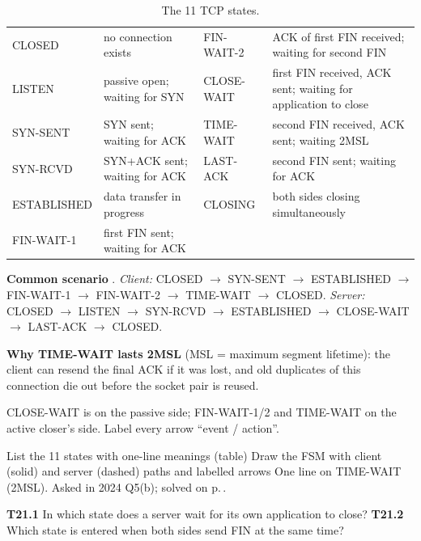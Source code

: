 \begin{table}[!htbp]\centering\footnotesize\zebra
\begin{tabularx}{\linewidth}{L{22mm}YL{20mm}Y}\toprule
{} &  &  & \\\midrule
CLOSED & no connection exists & FIN-WAIT-2 & ACK of first FIN received; waiting for second FIN\\
LISTEN & passive open; waiting for SYN & CLOSE-WAIT & first FIN received, ACK sent; waiting for application to close\\
SYN-SENT & SYN sent; waiting for ACK & TIME-WAIT & second FIN received, ACK sent; waiting 2MSL\\
SYN-RCVD & SYN+ACK sent; waiting for ACK & LAST-ACK & second FIN sent; waiting for ACK\\
ESTABLISHED & data transfer in progress & CLOSING & both sides closing simultaneously\\
FIN-WAIT-1 & first FIN sent; waiting for ACK &  & \\\bottomrule
\end{tabularx}
\caption{The 11 TCP states. }
\end{table}

\textbf{Common scenario} . \emph{Client:} CLOSED $\to$ SYN-SENT $\to$ ESTABLISHED $\to$ FIN-WAIT-1 $\to$ FIN-WAIT-2 $\to$ TIME-WAIT $\to$ CLOSED. \emph{Server:} CLOSED $\to$ LISTEN $\to$ SYN-RCVD $\to$ ESTABLISHED $\to$ CLOSE-WAIT $\to$ LAST-ACK $\to$ CLOSED.

\textbf{Why TIME-WAIT lasts 2MSL} (MSL = maximum segment lifetime): the client can resend the final ACK if it was lost, and old duplicates of this connection die out before the socket pair is reused.

\begin{warningbox}
CLOSE-WAIT is on the passive side; FIN-WAIT-1/2 and TIME-WAIT on the active closer's side. Label every arrow ``event / action''.
\end{warningbox}

\begin{answerplan}
 List the 11 states with one-line meanings (table) \quad {} Draw the FSM with client (solid) and server (dashed) paths and labelled arrows \quad
{} One line on TIME-WAIT (2MSL). Asked in 2024 Q5(b); solved on p.\,\pageref{q:MS2024-5b}.
\par{} \textbf{T21.1} In which state does a server wait for its own application to close?\quad
\textbf{T21.2} Which state is entered when both sides send FIN at the same time?
\end{answerplan}

